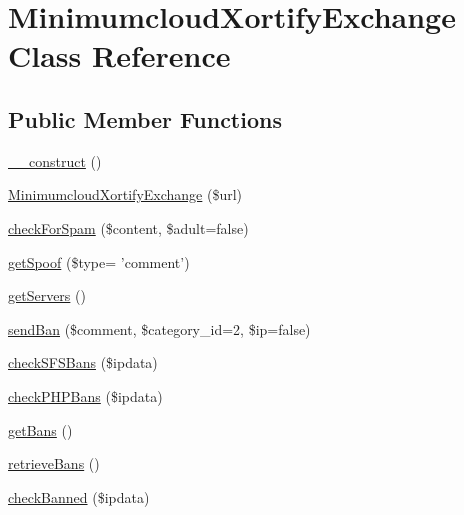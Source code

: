\hypertarget{class_minimumcloud_xortify_exchange}{\section{Minimumcloud\-Xortify\-Exchange Class Reference}
\label{class_minimumcloud_xortify_exchange}
}
\subsection*{Public Member Functions}
\begin{DoxyCompactItemize}
\item 
\hyperlink{class_minimumcloud_xortify_exchange_a095c5d389db211932136b53f25f39685}{\-\_\-\-\_\-construct} ()
\item 
\hyperlink{class_minimumcloud_xortify_exchange_aaef98b6ba174f0a6dba0dd3074477a67}{Minimumcloud\-Xortify\-Exchange} (\$url)
\item 
\hyperlink{class_minimumcloud_xortify_exchange_aa0d9f9689b3190c5a21a3bfc5e1b5217}{check\-For\-Spam} (\$content, \$adult=false)
\item 
\hyperlink{class_minimumcloud_xortify_exchange_ae7926cba79660f77479306100f492c03}{get\-Spoof} (\$type= 'comment')
\item 
\hyperlink{class_minimumcloud_xortify_exchange_a882f365bc81e207dc2123ef707735e82}{get\-Servers} ()
\item 
\hyperlink{class_minimumcloud_xortify_exchange_a0293acfa4afe0cb5b2816352a35d8ca7}{send\-Ban} (\$comment, \$category\-\_\-id=2, \$ip=false)
\item 
\hyperlink{class_minimumcloud_xortify_exchange_a985a563a84e3e5c54694fcce192bda53}{check\-S\-F\-S\-Bans} (\$ipdata)
\item 
\hyperlink{class_minimumcloud_xortify_exchange_aeb1bf9aaee4718870adbd07333490aaf}{check\-P\-H\-P\-Bans} (\$ipdata)
\item 
\hyperlink{class_minimumcloud_xortify_exchange_aea26db2906896833d32445a698fc4cdc}{get\-Bans} ()
\item 
\hyperlink{class_minimumcloud_xortify_exchange_a4af29af927aae9aada97ef0c2cd08fa1}{retrieve\-Bans} ()
\item 
\hyperlink{class_minimumcloud_xortify_exchange_ae41df0f26620b727f7f63342648f6474}{check\-Banned} (\$ipdata)
\end{DoxyCompactItemize}
